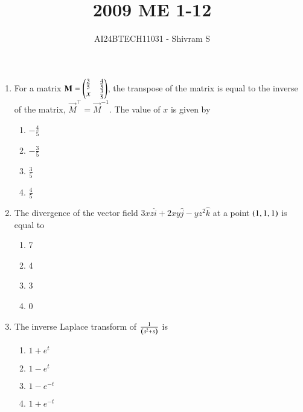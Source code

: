 \documentclass[journal]{IEEEtran}
\begin{document}

\onecolumn

\title{2009 ME 1-12}
\author{AI24BTECH11031 - Shivram S}
\maketitle
\bigskip

\renewcommand{\thefigure}{\theenumi}
\renewcommand{\thetable}{\theenumi}

\begin{enumerate}
    \item For a matrix $\mathbf{M} = \begin{pmatrix}\frac{3}{5} & \frac{4}{5} \\ x & \frac{3}{5}\end{pmatrix}$,
    the transpose of the matrix is equal to the inverse of the matrix, $\vec{M}^\top = \vec{M}^{-1}$.
    The value of $x$ is given by
    \begin{multicols}{4}
    \begin{enumerate}
        \item $-\frac{4}{5}$
        \item $-\frac{3}{5}$
        \item $\frac{3}{5}$
        \item $\frac{4}{5}$
    \end{enumerate}
    \end{multicols}

    \item The divergence of the vector field $3xz\hat{i} + 2xy\hat{j} - yz^2\hat{k}$
    at a point $\left(1, 1, 1\right)$ is equal to
    \begin{multicols}{4}
    \begin{enumerate}
        \item 7
        \item 4
        \item 3
        \item 0
    \end{enumerate}
    \end{multicols}

    \item The inverse Laplace transform of $\frac{1}{\left(s^2 + s\right)}$ is
    \begin{multicols}{4}
    \begin{enumerate}
        \item $1 + e^t$
        \item $1 - e^t$
        \item $1 - e^{-t}$
        \item $1 + e^{-t}$
    \end{enumerate}
    \end{multicols}


\end{enumerate}
\end{document}

